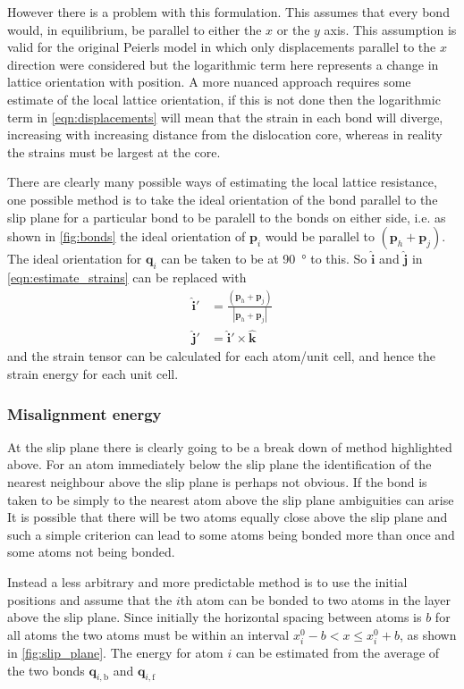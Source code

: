 However there is a problem with this formulation. This assumes that every bond would, in equilibrium, be parallel to either the $x$ or the $y$ axis. This assumption is valid for the original Peierls model in which only displacements parallel to the $x$ direction were considered but the logarithmic term here represents a change in lattice orientation with position. A more nuanced approach requires some estimate of the local lattice orientation, if this is not done then the logarithmic term in \autoref{eqn:displacements} will mean that the strain in each bond will diverge, increasing with increasing distance from the dislocation core, whereas in reality the strains must be largest at the core.

There are clearly many possible ways of estimating the local lattice resistance, one possible method is to take the ideal orientation of the bond parallel to the slip plane for a particular bond to be paralell to the bonds on either side, i.e. as shown in \autoref{fig:bonds} the ideal orientation of $\mathbf{p}_i$ would be  parallel to $(\mathbf{p}_h + \mathbf{p}_j)$. The ideal orientation for $\mathbf{q}_i$ can be taken to be at \SI{90}{\degree} to this. So $\mathbf{\hat{i}}$ and $\mathbf{\hat{j}}$ in \autoref{eqn:estimate_strains} can be replaced with 
\begin{align}
\mathbf{\hat{i}}' &= \frac{(\mathbf{p}_h + \mathbf{p}_j)}{|\mathbf{p}_h + \mathbf{p}_j|} \nonumber \\
\mathbf{\hat{j}}' &= {\mathbf{\hat{i}}' \times \mathbf{\hat{k}}}
\end{align}
and the strain tensor can be calculated for each atom/unit cell, and hence the strain energy for each unit cell.



\FloatBarrier
\subsubsection{Misalignment energy}
\FloatBarrier
At the slip plane there is clearly going to be a break down of method highlighted above. For an atom immediately below the slip plane the identification of the nearest neighbour above the slip plane is perhaps not obvious. If the bond is taken to be simply  to the nearest atom above the slip plane ambiguities can arise 
It is possible that there will be two atoms equally close above the slip plane and such a simple criterion can lead to some atoms being bonded more than once and some atoms not being bonded. 

Instead a less arbitrary and more predictable method is to use the initial positions and assume that the $i$th atom can be bonded to two atoms in the layer above the slip plane. Since initially the horizontal spacing between atoms is $b$ for all atoms the two atoms must be within an interval $x_i^0 - b < x \leq x_i^0 + b$, as shown in \autoref{fig:slip_plane}. The energy for atom $i$ can be estimated from the average of the two bonds $\mathbf{q}_{i,\text{b}}$ and $\mathbf{q}_{i,\text{f}}$

